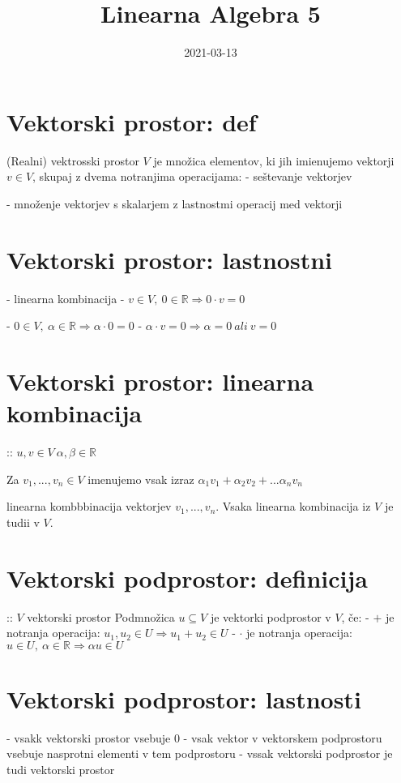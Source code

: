 \documentclass{article}
\author{  }
\date{ 2021-03-13 }
\title{ Linearna Algebra 5 }
\begin{document}
\maketitle
    \section*{ Vektorski prostor: def }
    (Realni) vektrosski prostor \(V\) je množica elementov, ki jih imienujemo vektorji \(v \in V\), skupaj z dvema notranjima operacijama: 
    - seštevanje vektorjev 

    - množenje vektorjev s skalarjem 
    z lastnostmi operacij med vektorji

    \section*{ Vektorski prostor: lastnostni }

    - linearna kombinacija 
    - \(v \in V, \ 0 \in \mathbb{R} \Rightarrow 0 \cdot v = 0\) 

    - \(0 \in V, \ \alpha \in \mathbb{R} \Rightarrow \alpha \cdot 0 = 0 \) 
    - \(\alpha \cdot v = 0 \Rightarrow \alpha = 0 \ ali \ v = 0 \)

    \section*{ Vektorski prostor: linearna kombinacija }
    :: \(u,v \in V \ \alpha, \beta \in \mathbb{R} \)


    Za \(v_1, ..., v_n \in V\) imenujemo vsak izraz \(\alpha_1 v_1 + \alpha_2 v_2 + ... \alpha_n v_n\) 

    linearna kombbbinacija vektorjev \(v_1, ..., v_n\). 
    Vsaka linearna kombinacija iz \(V\) je tudii v \(V\).

    \section*{ Vektorski podprostor: definicija }
    :: \(V\) vektorski prostor 
    Podmnožica \(u \subseteq V\) je vektorki podprostor v \(V\), če: 
    - \(+\) je notranja operacija: \(u_1, u_2 \in U \Rightarrow u_1 + u_2 \in U\) 
    - \(\cdot\) je notranja operacija: \(u \in U, \ \alpha \in \mathbb{R} \Rightarrow \alpha u \in U\)

    \section*{ Vektorski podprostor: lastnosti }
    - vsakk vektorski prostor vsebuje \(0\) 
    - vsak vektor v vektorskem podprostoru vsebuje nasprotni elementi v tem podprostoru 
    - vssak vektorski podprostor je tudi vektorski prostor
\end{document}
